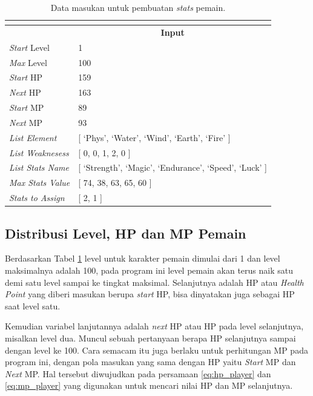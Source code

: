 \begin{longtable}{|l|l|}
	\caption{Data masukan untuk pembuatan \textit{stats} pemain.}
	\vspace{1ex}
	\label{tb:player_input_variable}\\
	\hline
	\rowcolor[HTML]{9B9B9B} 
	\multicolumn{1}{|c|}{\cellcolor[HTML]{9B9B9B}\textbf{Variabel}} & \multicolumn{1}{c|}{\cellcolor[HTML]{9B9B9B}\textbf{Input}} \\ \hline
	\textit{Start} Level & 1 \\ \hline
	\textit{Max} Level & 100 \\ \hline
	\textit{Start} HP & 159 \\ \hline
	\textit{Next} HP & 163 \\ \hline
	\textit{Start} MP & 89 \\ \hline
	\textit{Next} MP & 93 \\ \hline
	\textit{List Element} & {[} `Phys', `Water', `Wind', `Earth', `Fire' {]} \\ \hline
	\textit{List Weaknesess} & {[} 0, 0, 1, 2, 0 {]} \\ \hline
	\textit{List Stats Name} & {[} `Strength', `Magic', `Endurance', `Speed', `Luck' {]} \\ \hline
	\textit{Max Stats Value} & {[} 74, 38, 63, 65, 60 {]} \\ \hline
	\textit{Stats to Assign} & {[} 2, 1 {]} \\ \hline
\end{longtable}
\vspace{1ex}

\subsection{Distribusi Level, HP dan MP Pemain}
\label{sec:sub_sec3_player_level_hp_mp}
\vspace{1ex}

Berdasarkan Tabel \ref{tb:player_input_variable} level untuk karakter pemain dimulai dari 1 dan level maksimalnya adalah 100, pada program ini level pemain akan terus naik satu demi satu level sampai ke tingkat maksimal. Selanjutnya adalah HP atau \textit{Health Point} yang diberi masukan berupa \textit{start} HP, bisa dinyatakan juga sebagai HP saat level satu. 
\vspace{1ex}

Kemudian variabel lanjutannya adalah \textit{next} HP atau HP pada level selanjutnya, misalkan level dua. Muncul sebuah pertanyaan berapa HP selanjutnya sampai dengan level ke 100. Cara semacam itu juga berlaku untuk perhitungan MP pada program ini, dengan pola masukan yang sama dengan HP yaitu \textit{Start} MP dan \textit{Next} MP. Hal tersebut diwujudkan pada persamaan \ref{eq:hp_player} dan \ref{eq:mp_player} yang digunakan untuk mencari nilai HP dan MP selanjutnya.
\vspace{1ex}

